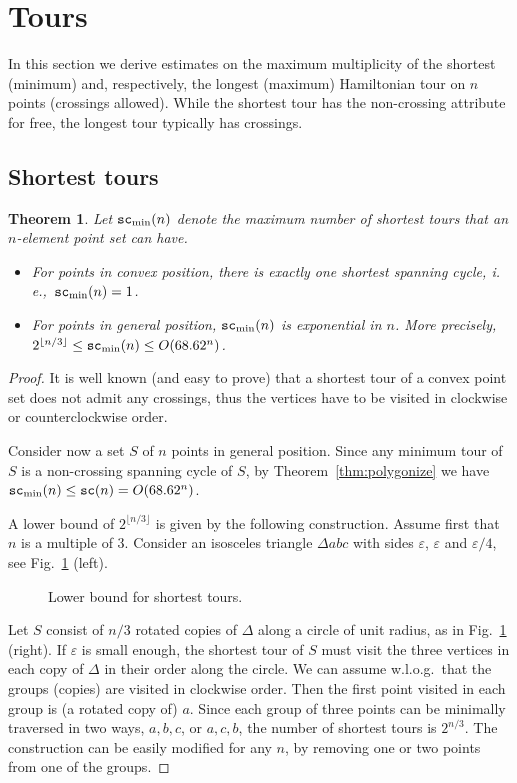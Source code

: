 \documentclass[11pt]{article}
\newtheorem{theorem}{Theorem}
\newcommand{\eps}{\varepsilon}
\def\ie{{\it i.\,e.},~}
\def\sc{{\tt sc}}
\begin{document}
\section {Tours}\label{sec:tours}

In this section we derive estimates on the maximum multiplicity of
the shortest (minimum) and, respectively, the longest (maximum) Hamiltonian
tour on $n$ points (crossings allowed).
While the shortest tour has the non-crossing attribute for
free, the longest tour typically has crossings.


\subsection{Shortest tours}
\begin{theorem} \label{thm:min-tours}
Let $\sc_{\rm min}(n)$ denote the maximum number of shortest tours that
an $n$-element point set can have.
\begin{itemize}
\item [{\rm (i)}] For points in convex position, there is exactly
  one shortest spanning cycle, \ie $\sc_{\rm min}(n)=1$.
\item [{\rm (ii)}] For points in general position, $\sc_{\rm min}(n)$
is exponential in $n$. More precisely,
$ 2^{\lfloor n/3 \rfloor} \leq \sc_{\rm min}(n) \leq O(68.62^n) $.
\end{itemize}
\end{theorem}
\begin{proof}
It is well known (and easy to prove) that a shortest tour of a convex
point set does not admit any crossings, thus the vertices have to be
visited in clockwise or counterclockwise order.

\smallskip
{} Consider now a set $S$ of $n$ points in general
position. Since any minimum tour of $S$ is a non-crossing spanning cycle of $S$,
by Theorem~\ref{thm:polygonize} we have $\sc_{\rm min}(n) \leq \sc(n) = O(68.62^n)$.

A lower bound of $2^{\lfloor n/3 \rfloor}$ is given by the following construction.
Assume first that $n$ is a multiple of $3$. Consider an isosceles
triangle $\Delta{abc}$ with sides $\eps$, $\eps$ and $\eps/4$,
see Fig.~\ref{f2} (left).
\begin{figure}[htbp]
\centerline{\epsfysize=2.1in }
\caption{Lower bound for shortest tours.}
\label{f2}
\end{figure}
Let $S$ consist of $n/3$ rotated copies of $\Delta$
along a circle of unit radius, as in Fig.~\ref{f2} (right).
If $\eps$ is small enough, the shortest tour of $S$ must visit the three
vertices in each copy of $\Delta$ in their order along the circle.
We can assume w.l.o.g.\ that the groups (copies) are visited in clockwise order.
Then the first point visited in each group is (a rotated copy of) $a$.
Since each group of three points can be minimally traversed in two
ways, $a,b,c$, or $a,c,b$, the number of shortest tours is $2^{n/3}$.
The construction can be easily modified for any $n$,
by removing one or two points from one of the groups.
\end{proof}
\end{document}
